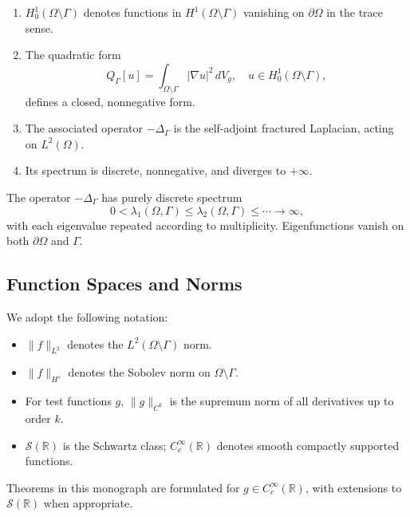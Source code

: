 \begin{enumerate}[label=(A\arabic*)]
  \item $H^1_0(\Omega\setminus\Gamma)$ denotes functions in
  $H^1(\Omega\setminus\Gamma)$ vanishing on $\partial\Omega$ in the trace sense.
  \item The quadratic form
  \[
    Q_\Gamma[u] = \int_{\Omega\setminus\Gamma} |\nabla u|^2 \, dV_g,
  \quad u\in H^1_0(\Omega\setminus\Gamma),
  \]
  defines a closed, nonnegative form.
  \item The associated operator $-\Delta_\Gamma$ is the self-adjoint fractured
  Laplacian, acting on $L^2(\Omega)$.
  \item Its spectrum is discrete, nonnegative, and diverges to $+\infty$.
\end{enumerate}

\begin{proposition}
The operator $-\Delta_\Gamma$ has purely discrete spectrum
\[
0 < \lambda_1(\Omega,\Gamma) \leq \lambda_2(\Omega,\Gamma) \leq \cdots \to \infty,
\]
with each eigenvalue repeated according to multiplicity. Eigenfunctions vanish
on both $\partial\Omega$ and $\Gamma$.
\end{proposition}

\subsection{Function Spaces and Norms}

We adopt the following notation:

\begin{itemize}
  \item $\|f\|_{L^2}$ denotes the $L^2(\Omega\setminus\Gamma)$ norm.
  \item $\|f\|_{H^s}$ denotes the Sobolev norm on $\Omega\setminus\Gamma$.
  \item For test functions $g$, $\|g\|_{C^k}$ is the supremum norm of all
  derivatives up to order $k$.
  \item $\mathcal{S}(\mathbb{R})$ is the Schwartz class; $C_c^\infty(\mathbb{R})$
  denotes smooth compactly supported functions.
\end{itemize}

Theorems in this monograph are formulated for $g\in C_c^\infty(\mathbb{R})$,
with extensions to $\mathcal{S}(\mathbb{R})$ when appropriate.

